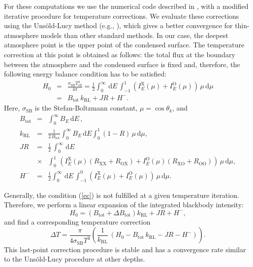 \documentclass{aa}
\newcommand{\beq}{\begin{equation}}
\newcommand{\eeq}{\end{equation}}
\newcommand{\bea}{\begin{eqnarray}}
\newcommand{\eea}{\end{eqnarray}}
\newcommand{\dd}{\mathrm{d}} %
\newcommand{\Teff}{T_\mathrm{eff}}
\begin{document}
For these computations we use the numerical code
described in \cite{SuleimanovPW09}, with a modified
iterative procedure for temperature corrections. We evaluate
these corrections using
the Uns\"old-Lucy method (e.g., \citealt{Mihalas}),
which gives a better
convergence for thin-atmosphere models than 
other standard methods. In our case, the deepest atmosphere  point
is the upper point of the condensed surface. The
temperature
correction at this point is
obtained as follows: the total flux at the boundary between the
atmosphere and the condensed surface is fixed and,
therefore, the following energy balance condition has to be
satisfied:
\bea \label{ec}
H_0 &=& \frac{\sigma_\mathrm{SB}\Teff^4}{4\pi}
 = \frac{1}{2}\int_0^\infty\,\dd E\, 
\int_{-1}^{1} \left(
 I_{E}^{\mathrm{X}}(\mu) +I_{E}^{\mathrm{O}}(\mu)
   \right)\,\mu\, \dd\mu 
\nonumber \\
&=& B_\mathrm{tot}\,k_\mathrm{RL} + JR + H^-.
\eea
Here, $\sigma_\mathrm{SB}$ is the
Stefan-Boltzmann constant, $\mu=\cos \theta_k$, and
\bea \label{ec1}
B_\mathrm{tot} &=& \int_0^\infty B_E\,\dd E\,, 
\nonumber \\
k_\mathrm{RL} &=& \frac{1}{2\,B_\mathrm{tot}}
   \int_0^\infty B_E\,\dd E
     \int_0^1 (1-R)\,\mu\,\dd\mu, 
\nonumber \\
JR &=& \frac{1}{2}\,\int_0^\infty\, \dd E\, 
\nonumber \\
&\times&\int_0^1\, \left( I_{E}^{\mathrm{X}}(\mu)(R_\mathrm{XX}+R_\mathrm{OX}) +
I_{E}^{\mathrm{O}}(\mu)(R_\mathrm{XO}+R_\mathrm{OO})\right)
\,\mu\,\dd\mu, 
\nonumber \\
H^- &=& \frac{1}{2}\int_0^\infty\,\dd E \, 
\int_{-1}^{0} \left(
 I_{E}^{\mathrm{X}}(\mu) +I_{E}^{\mathrm{O}}(\mu)
   \right)\,\mu\, \dd\mu.
\eea

Generally, the condition (\ref{ec}) is not fulfilled at a
given temperature iteration. Therefore,
we perform a linear expansion of the integrated blackbody intensity:
\beq \label{db}
H_0 =(B_\mathrm{tot}+\Delta B_\mathrm{tot})k_\mathrm{RL} + JR + H^-,
\eeq
 and find a corresponding temperature correction
\beq
\label{dt}
\Delta T =
\frac{\pi}{4\sigma_\mathrm{SB}T^3}\left(\frac{1}{k_\mathrm{RL}}\, 
\left(H_0 -
B_\mathrm{tot}\,k_\mathrm{RL}-JR-H^-\right)\right).
\eeq  
This last-point correction procedure is stable and has a convergence rate similar to 
the Uns\"old-Lucy procedure at other depths.
\end{document}
